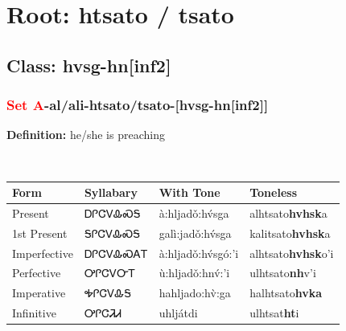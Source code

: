 \needspace{4in}
\section*{Root: htsato / tsato}
\nopagebreak
{}
\needspace{3in}
\subsection*{Class: hvsg-hn[inf2]}
\nopagebreak
\needspace{2in}
\subsubsection*{\textcolor{Red}{Set A}{-}al/ali{-}\textbf{htsato/tsato}{-}[hvsg-hn[inf2]]}
\nopagebreak
\textbf{Definition: } he/she is preaching
\\[0.5em]
\begin{tabularx}{\textwidth}{l X X X}%
\toprule%
\textbf{Form}&\textbf{Syllabary}&\textbf{With Tone}&\textbf{Toneless}\\%
\midrule%
Present&ᎠᎵᏣᏙᎲᏍᎦ&à:hljadǒ:hv́sga&alhtsato\textbf{hvhsk}a\\%
1st Present&ᎦᎵᏣᏙᎲᏍᎦ&galì:jadǒ:hv́sga&kalitsato\textbf{hvhsk}a\\%
Imperfective&ᎠᎵᏣᏙᎲᏍᎪᎢ&à:hljadǒ:hv́sgó:’i&alhtsato\textbf{hvhsk}o'i\\%
Perfective&ᎤᎵᏣᏙᏅᎢ&ù:hljadǒ:hnv́:’i&ulhtsato\textbf{nh}v'i\\%
Imperative&ᎭᎵᏣᏙᎲᎦ&hahljado:hv̀:ga&halhtsato\textbf{hvka}\\%
Infinitive&ᎤᎵᏣᏘᏗ&uhljátdi&ulhtsat\textbf{ht}i\\%
\bottomrule%
\end{tabularx}
\\[1em]